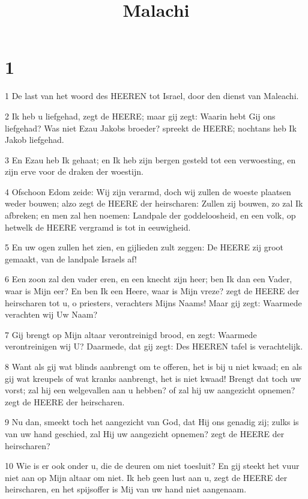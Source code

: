 

\title{Malachi}



\chapter{1}

\par 1 De last van het woord des HEEREN tot Israel, door den dienst van Maleachi.
\par 2 Ik heb u liefgehad, zegt de HEERE; maar gij zegt: Waarin hebt Gij ons liefgehad? Was niet Ezau Jakobs broeder? spreekt de HEERE; nochtans heb Ik Jakob liefgehad.
\par 3 En Ezau heb Ik gehaat; en Ik heb zijn bergen gesteld tot een verwoesting, en zijn erve voor de draken der woestijn.
\par 4 Ofschoon Edom zeide: Wij zijn verarmd, doch wij zullen de woeste plaatsen weder bouwen; alzo zegt de HEERE der heirscharen: Zullen zij bouwen, zo zal Ik afbreken; en men zal hen noemen: Landpale der goddeloosheid, en een volk, op hetwelk de HEERE vergramd is tot in eeuwigheid.
\par 5 En uw ogen zullen het zien, en gijlieden zult zeggen: De HEERE zij groot gemaakt, van de landpale Israels af!
\par 6 Een zoon zal den vader eren, en een knecht zijn heer; ben Ik dan een Vader, waar is Mijn eer? En ben Ik een Heere, waar is Mijn vreze? zegt de HEERE der heirscharen tot u, o priesters, verachters Mijns Naams! Maar gij zegt: Waarmede verachten wij Uw Naam?
\par 7 Gij brengt op Mijn altaar verontreinigd brood, en zegt: Waarmede verontreinigen wij U? Daarmede, dat gij zegt: Des HEEREN tafel is verachtelijk.
\par 8 Want als gij wat blinds aanbrengt om te offeren, het is bij u niet kwaad; en als gij wat kreupels of wat kranks aanbrengt, het is niet kwaad! Brengt dat toch uw vorst; zal hij een welgevallen aan u hebben? of zal hij uw aangezicht opnemen? zegt de HEERE der heirscharen.
\par 9 Nu dan, smeekt toch het aangezicht van God, dat Hij ons genadig zij; zulks is van uw hand geschied, zal Hij uw aangezicht opnemen? zegt de HEERE der heirscharen?
\par 10 Wie is er ook onder u, die de deuren om niet toesluit? En gij steekt het vuur niet aan op Mijn altaar om niet. Ik heb geen lust aan u, zegt de HEERE der heirscharen, en het spijsoffer is Mij van uw hand niet aangenaam.
